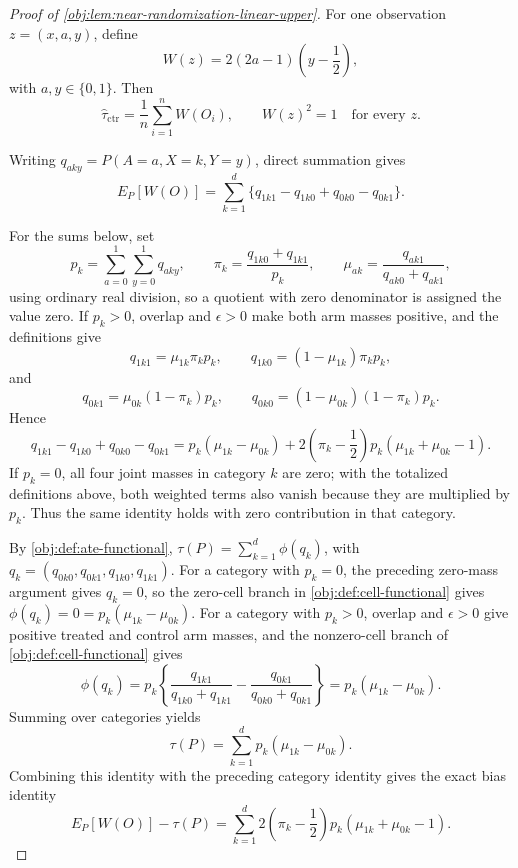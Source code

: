 \documentclass[11pt]{article}
\begin{document}
\begin{proof}[Proof of \cref{obj:lem:near-randomization-linear-upper}]
For one observation \(z=(x,a,y)\), define
\[
W(z)=2(2a-1)\left(y-\frac12\right),
\]
with \(a,y\in\{0,1\}\). Then
\[
\widehat\tau_{\mathrm{ctr}}
=
\frac1n\sum_{i=1}^n W(O_i),
\qquad
W(z)^2=1
\quad\text{for every }z .
\]

Writing \(q_{aky}=P(A=a,X=k,Y=y)\), direct summation gives
\[
E_P[W(O)]
=
\sum_{k=1}^d
\{q_{1k1}-q_{1k0}+q_{0k0}-q_{0k1}\}.
\]

For the sums below, set
\[
p_k=\sum_{a=0}^1\sum_{y=0}^1 q_{aky},
\qquad
\pi_k=\frac{q_{1k0}+q_{1k1}}{p_k},
\qquad
\mu_{ak}=\frac{q_{ak1}}{q_{ak0}+q_{ak1}},
\]
using ordinary real division, so a quotient with zero denominator is assigned the value zero. If \(p_k>0\), overlap and \(\epsilon>0\) make both arm masses positive, and the definitions give
\[
q_{1k1}=\mu_{1k}\pi_kp_k,
\qquad
q_{1k0}=(1-\mu_{1k})\pi_kp_k,
\]
and
\[
q_{0k1}=\mu_{0k}(1-\pi_k)p_k,
\qquad
q_{0k0}=(1-\mu_{0k})(1-\pi_k)p_k .
\]
Hence
\[
q_{1k1}-q_{1k0}+q_{0k0}-q_{0k1}
=
p_k(\mu_{1k}-\mu_{0k})
+
2\left(\pi_k-\frac12\right)p_k(\mu_{1k}+\mu_{0k}-1).
\]
If \(p_k=0\), all four joint masses in category \(k\) are zero; with the totalized definitions above, both weighted terms also vanish because they are multiplied by \(p_k\). Thus the same identity holds with zero contribution in that category. %

By \cref{obj:def:ate-functional}, \(\tau(P)=\sum_{k=1}^d\phi(q_k)\), with \(q_k=(q_{0k0},q_{0k1},q_{1k0},q_{1k1})\). For a category with \(p_k=0\), the preceding zero-mass argument gives \(q_k=0\), so the zero-cell branch in \cref{obj:def:cell-functional} gives \(\phi(q_k)=0=p_k(\mu_{1k}-\mu_{0k})\). For a category with \(p_k>0\), overlap and \(\epsilon>0\) give positive treated and control arm masses, and the nonzero-cell branch of \cref{obj:def:cell-functional} gives
\[
\phi(q_k)
=
p_k\left\{
\frac{q_{1k1}}{q_{1k0}+q_{1k1}}
-
\frac{q_{0k1}}{q_{0k0}+q_{0k1}}
\right\}
=
p_k(\mu_{1k}-\mu_{0k}).
\]
Summing over categories yields
\[
\tau(P)=\sum_{k=1}^d p_k(\mu_{1k}-\mu_{0k}).
\]
Combining this identity with the preceding category identity gives the exact bias identity
\[
E_P[W(O)]-\tau(P)
=
\sum_{k=1}^d
2\left(\pi_k-\frac12\right)p_k(\mu_{1k}+\mu_{0k}-1).
\]


\end{proof}
\end{document}
